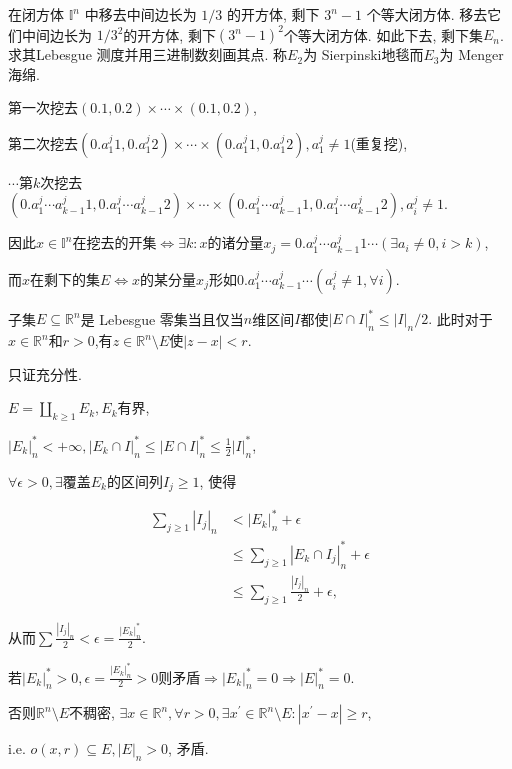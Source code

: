 \begin{10}
在闭方体 $\mathbb{I}^n$ 中移去中间边长为 $1/3$ 的开方体, 剩下 $3^n-1$ 个等大闭方体. 
移去它们中间边长为 $1/3^2$的开方体, 剩下$(3^n-1)^2$个等大闭方体. 
如此下去, 剩下集$E_n$. 求其Lebesgue 测度并用三进制数刻画其点. 
称$E_{2}$为 Sierpinski地毯而$E_{3}$为 Menger 海绵.
\end{10}

\begin{solution}
第一次挖去$(0.1,0.2)\times\cdots\times(0.1,0.2)$,

第二次挖去$(0.a_1^j1,0.a_1^j2)\times\cdots\times(0.a_1^j1,0.a_1^j2),a_1^j\neq1$(重复挖),

$\cdots$第$k$次挖去$(0.a_1^j\cdots a_{k-1}^j1,0.a_1^j\cdots a_{k-1}^j2)\times\cdots\times(0.a_1^j\cdots a_{k-1}^j1,0.a_1^j\cdots a_{k-1}^j2),a_i^j\neq1$.

因此$x\in\mathbb{I}^n$在挖去的开集$\iff \exists k:x$的诸分量$x_j=0.a_1^j\cdots a_{k-1}^j1\cdots(\exists a_i\neq0,i>k)$,

而$x$在剩下的集$E\iff x$的某分量$x_j$形如$0.a_1^j\cdots a_{k-1}^j\cdots(a_i^j\neq1,\forall i)$.
\end{solution}



\begin{11}
子集$E\subseteq\mathbb{R}^n$是 Lebesgue 零集当且仅当$n$维区间$I$都使$|E\cap I|_n^*\leqslant|I|_n/2.$
此时对于$x\in\mathbb{R}^n$和$r>0$,有$z\in\mathbb{R}^n\setminus E$使$|z-x|<r$.
\end{11}
\begin{solution}
只证充分性.

$E=\coprod\limits_{k\geqslant1}E_k,E_k$有界,

$|E_k|^*_n<+\infty,|E_k\cap I|^*_n\leqslant|E\cap I|^*_n\leqslant \frac{1}{2}| I|^*_n$,

$\forall\epsilon>0,\exists$覆盖$E_k$的区间列$I_j\geqslant1$, 使得

\begin{align*}
    \sum_{j\geqslant1}|I_j|_n&<|E_k|^*_n+\epsilon\\
    &\leqslant\sum_{j\geqslant1}|E_k\cap I_j|^*_n+\epsilon\\
    &\leqslant\sum_{j\geqslant1}\frac{|I_j|_n}{2}+\epsilon,
\end{align*}

从而$\sum\frac{|I_j|_n}{2}<\epsilon=\frac{|E_k|^*_n}{2}$.

若$|E_k|^*_n>0,\epsilon=\frac{|E_k|^*_n}{2}>0$则矛盾$\Rightarrow|E_k|^*_n=0\Rightarrow|E|^*_n=0.$

否则$\mathbb{R}^n\setminus E$不稠密, $\exists x\in\mathbb{R}^n,\forall r>0,\exists x^\prime\in\mathbb{R}^n\setminus E:|x^\prime-x|\geqslant r$,

i.e. $o(x,r)\subseteq E,|E|_n>0$, 矛盾.
\end{solution}

